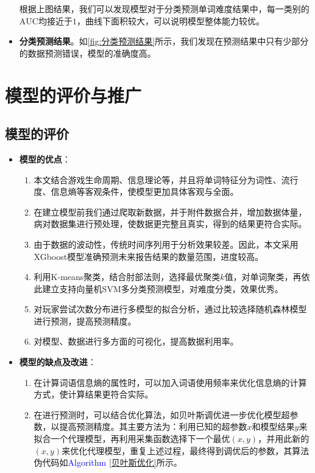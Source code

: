 \documentclass{MathModeling}
\begin{document}
\begin{itemize}
		根据上图结果，我们可以发现模型对于分类预测单词难度结果中，每一类别的$\text{AUC}$均接近于$1$，曲线下面积较大，可以说明模型整体能力较优。

		\item \textbf{分类预测结果}。如\textcolor{blue}{\cref{fig:分类预测结果}}所示，我们发现在预测结果中只有少部分的数据预测错误，模型的准确度高。
	\end{itemize}
\section{模型的评价与推广}
	\subsection{模型的评价}
	\begin{itemize}
		\item \textbf{模型的优点}：
			\begin{enumerate}
				\item 本文结合游戏生命周期、信息理论等，并且将单词特征分为词性、流行度、信息熵等客观条件，使模型更加具体客观与全面。
				\item 在建立模型前我们通过爬取新数据，并于附件数据合并，增加数据体量，病对数据集进行预处理，使数据更完整且真实，得到的结果更符合实际。
				\item 由于数据的波动性，传统时间序列用于分析效果较差。因此，本文采用XGboost模型准确预测未来报告结果的数量范围，进度较高。
				\item 利用K-means聚类，结合肘部法则，选择最优聚类$k$值，对单词聚类，再依此建立支持向量机SVM多分类预测模型，对难度分类，效果优秀。
				\item 对玩家尝试次数分布进行多模型的拟合分析，通过比较选择随机森林模型进行预测，提高预测精度。
				\item 对模型、数据进行多方面的可视化，提高数据利用率。
			\end{enumerate}
		\item \textbf{模型的缺点及改进}：
			\begin{enumerate}
				\item 在计算词语信息熵的属性时，可以加入词语使用频率来优化信息熵的计算方式，使计算结果更符合实际。
				\item 在进行预测时，可以结合优化算法，如贝叶斯调优进一步优化模型超参数，以提高预测精度。其主要方法为：利用已知的超参数$x$和模型结果$y$来拟合一个代理模型，再利用采集函数选择下一个最优$\left(x,y\right)$，并用此新的$\left(x,y\right)$来优化代理模型，重复上述过程，最终得到调优后的参数，其算法伪代码如\textcolor{blue}{Algorithm \ref{贝叶斯优化}}所示。
			\end{enumerate}
	\end{itemize}
\end{document}
